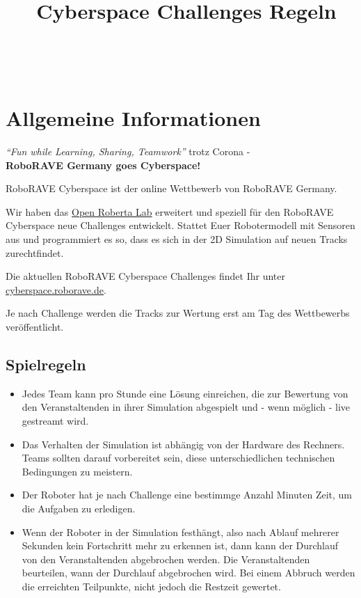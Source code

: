 \documentclass[a4paper,12pt]{article}
\begin{document}


\title{\tagYear\ Cyberspace Challenges Regeln}
\makeatletter
\let\inserttitle\@title
\makeatother
\begin{center}
	\rrcybLogo
	\huge                      %
	\bfseries                   %
	\\
	\inserttitle
\end{center}

\section{Allgemeine Informationen}

\begin{center}
\emph{"`Fun while Learning, Sharing, Teamwork"'} trotz Corona -
\\
\textbf{RoboRAVE Germany goes Cyberspace!}
\end{center}

RoboRAVE Cyberspace ist der online Wettbewerb von RoboRAVE Germany.

Wir haben das
\href{https://www.roberta-home.de/lab/}{Open Roberta Lab}
erweitert und speziell für den RoboRAVE Cyberspace neue Challenges entwickelt.
Stattet Euer Robotermodell mit Sensoren aus und programmiert es so, dass es
sich in der 2D Simulation auf neuen Tracks zurechtfindet.

Die aktuellen RoboRAVE Cyberspace Challenges findet Ihr unter
\href{https://www.cyberspace.roborave.de/lab/}{cyberspace.roborave.de}.

Je nach Challenge werden die Tracks zur Wertung erst am Tag des Wettbewerbs
veröffentlicht.

\subsection{Spielregeln}

\begin{itemize}
	\item Jedes Team kann pro Stunde eine Lösung einreichen, die zur
Bewertung von den Veranstaltenden in ihrer Simulation abgespielt und - wenn
möglich - live gestreamt wird.
	\item Das Verhalten der Simulation ist abhängig von der Hardware des
Rechners. Teams sollten darauf vorbereitet sein, diese unterschiedlichen
technischen Bedingungen zu meistern.
	\item Der Roboter hat je nach Challenge eine bestimmge Anzahl Minuten
Zeit, um die Aufgaben zu erledigen.
	\item Wenn der Roboter in der Simulation festhängt, also nach Ablauf
mehrerer Sekunden kein Fortschritt mehr zu erkennen ist, dann kann der
Durchlauf von den Veranstaltenden abgebrochen werden. Die Veranstaltenden
beurteilen, wann der Durchlauf abgebrochen wird. Bei einem Abbruch werden die
erreichten Teilpunkte, nicht jedoch die Restzeit gewertet.
\end{itemize}
\end{document}

